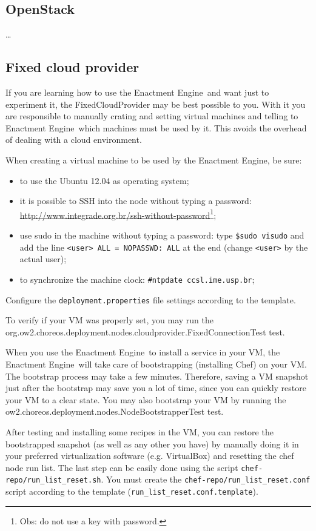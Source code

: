 \documentclass[a4paper, 10pt]{article}
\newcommand{\ee}{Enactment Engine}
\begin{document}
\subsection{OpenStack}

\dots

\subsection{Fixed cloud provider}

If you are learning how to use the \ee\ and want just to experiment it, the \textsf{FixedCloudProvider} may be best possible to you. With it you are responsible to manually crating and setting virtual machines and telling to \ee\ which machines must be used by it. This avoids the overhead of dealing with a cloud environment. 

When creating a virtual machine to be used by the \ee, be sure:
\begin{itemize}
\item to use the Ubuntu 12.04 as operating system;
\item it is possible to SSH into the node without typing a password: \url{http://www.integrade.org.br/ssh-without-password}\footnote{Obs: do not use a key with password.};
\item use sudo in the machine without typing a password: type \texttt{\$sudo visudo} and add the line \texttt{<user> ALL = NOPASSWD: ALL} at the end (change \texttt{<user>} by the actual user);
\item to synchronize the machine clock: \texttt{\#ntpdate ccsl.ime.usp.br};
\end{itemize}

Configure the \texttt{deployment.properties} file settings according to the template.

To verify if your VM was properly set, you may run the \\ \textsf{org.ow2.choreos.deployment.nodes.cloudprovider.FixedConnectionTest} test.

When you use the \ee\ to install a service in your VM, the \ee\ will take care of bootstrapping (installing Chef) on your VM. The bootstrap process may take a few minutes. Therefore, saving a VM snapshot just after the bootstrap may save you a lot of time, since you can quickly restore your VM to a clear state. You may also bootstrap your VM by running the \textsf{ow2.choreos.deployment.nodes.NodeBootstrapperTest} test.

After testing and installing some recipes in the VM, you can restore the bootstrapped snapshot (as well as any other you have) by manually doing it in your preferred virtualization software (e.g. VirtualBox) and resetting the chef node run list. The last step can be easily done using the script \texttt{chef-repo/run\_list\_reset.sh}. You must create the \texttt{chef-repo/run\_list\_reset.conf} script according to the template (\texttt{run\_list\_reset.conf.template}).
\end{document}
